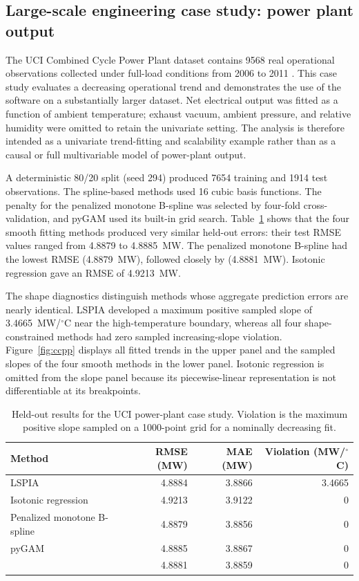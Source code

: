 \subsection{Large-scale engineering case study: power plant output}

The UCI Combined Cycle Power Plant dataset contains 9568 real operational
observations collected under full-load conditions from 2006 to 2011
\cite{uciCcpp2014,tufekci2014}. This case study evaluates a decreasing
operational trend and demonstrates the use of the software on a substantially
larger dataset. Net electrical output was fitted as a function of ambient
temperature; exhaust vacuum, ambient pressure, and relative humidity were
omitted to retain the univariate setting. The analysis is therefore intended
as a univariate trend-fitting and scalability example rather than as a causal
or full multivariable model of power-plant output.

A deterministic 80/20 split (seed 294) produced 7654 training and 1914 test
observations. The spline-based methods used 16 cubic basis functions. The
penalty for the penalized monotone B-spline was selected by four-fold
cross-validation, and pyGAM used its built-in grid search. Table~\ref{tab:ccpp-results}
shows that the four smooth fitting methods produced very similar held-out
errors: their test RMSE values ranged from 4.8879 to 4.8885~MW. The penalized
monotone B-spline had the lowest RMSE (4.8879~MW), followed closely by
\software{} (4.8881~MW). Isotonic regression gave an RMSE of 4.9213~MW.

The shape diagnostics distinguish methods whose aggregate prediction errors
are nearly identical. LSPIA developed a maximum positive sampled slope of
3.4665~MW/$^\circ$C near the high-temperature boundary, whereas all four
shape-constrained methods had zero sampled increasing-slope violation.
Figure~\ref{fig:ccpp} displays all fitted trends in the upper panel and the
sampled slopes of the four smooth methods in the lower panel. Isotonic
regression is omitted from the slope panel because its piecewise-linear
representation is not differentiable at its breakpoints.

\begin{table}[ht]
\centering
\caption{Held-out results for the UCI power-plant case study. Violation is
the maximum positive slope sampled on a 1000-point grid for a nominally
decreasing fit.}
\label{tab:ccpp-results}
\footnotesize
\begin{tabular}{@{}lrrr@{}}
\toprule
Method & RMSE (MW) & MAE (MW) & Violation (MW/$^\circ$C) \\
\midrule
LSPIA & 4.8884 & 3.8866 & 3.4665 \\
Isotonic regression & 4.9213 & 3.9122 & 0 \\
Penalized monotone B-spline & 4.8879 & 3.8856 & 0 \\
pyGAM & 4.8885 & 3.8867 & 0 \\
\software{} & 4.8881 & 3.8859 & 0 \\
\bottomrule
\end{tabular}
\end{table}

